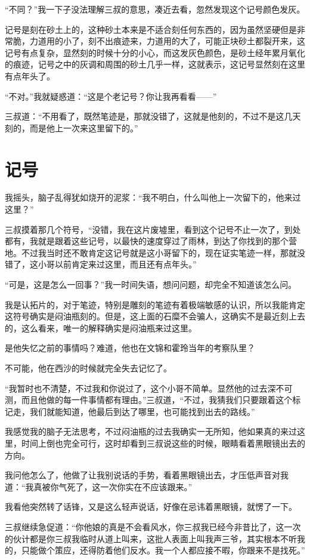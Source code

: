 “不同？”我一下子没法理解三叔的意思，凑近去看，忽然发现这个记号颜色发灰。

记号是刻在砂土上的，这种砂土本来是不适合刻任何东西的，因为虽然坚硬但是非常脆，力道用的小了，刻不出痕迹来，力道用的大了，可能正块砂土都裂开来，这记号有点复杂，显然刻的时候十分的小心，而这发灰色颜色，是砂土经年累月氧化的痕迹，记号之中的灰调和周围的砂土几乎一样，这就表示，这记号显然刻在这里有点年头了。

“不对。”我就疑惑道：“这是个老记号？你让我再看看——”

三叔道：“不用看了，既然笔迹是，那就没错了，这就是他刻的，不过不是这几天刻的，而是他上一次来这里留下的。”

\chapter{记号}

我摇头，脑子乱得犹如烧开的泥浆：“我不明白，什么叫他上一次留下的，他来过这里？”

三叔摸着那几个符号，“没错，我在这片废墟里，看到这个记号不止一次了，到处都有，我就是跟着这些记号，以最快的速度穿过了雨林，到达了你找到的那个营地。不过我当时还不敢肯定这记号就是这小哥留下的，现在证实笔迹一样，那就没错了，这小哥以前肯定来过这里，而且还有点年头。”

“可是，这是怎么一回事？”我一时间失语，想问问题，却完全不知道该怎么问。

我是认拓片的，对于笔迹，特别是雕刻的笔迹有着极端敏感的认识，所以我能肯定这符号确实是闷油瓶刻的。但是，这上面的石糜不会骗人，这确实不是最近刻上去的，这么看来，唯一的解释确实是闷油瓶来过这里。

是他失忆之前的事情吗？难道，他也在文锦和霍玲当年的考察队里？

不可能，他在西沙的时候就完全失去记忆了。

“我暂时也不清楚，不过我和你说过了，这个小哥不简单。显然他的过去深不可测，而且他做的每一件事情都有理由。”三叔道，“不过，我猜我们只要跟着这个标记走，我们就能知道，他最后到达了哪里，也可能找到出去的路线。”

我感觉我的脑子无法思考，不过闷油瓶的过去我确实一无所知，他如果真的来过这里，时间上倒也完全可行，这时却看到三叔说这些的时候，眼睛看着黑眼镜出去的方向。

我问他怎么了，他做了让我别说话的手势，看着黑眼镜出去，才压低声音对我道：“我真被你气死了，这一次你实在不应该跟来。”

我看他突然转了话锋，又是这么轻声说话，好像在忌讳着黑眼镜，就愣了一下。

三叔继续急促道：“你他娘的真是不会看风水，你三叔我已经今非昔比了，这一次的伙计都是你三叔我临时从道上叫来，这批人表面上叫我声三爷，其实根本不听我的，只能做个策应，还得防着他们反水。我一个人都应接不暇，你跟来不是找死。”

